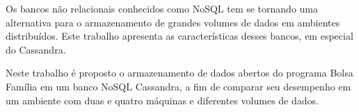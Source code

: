 Os bancos não relacionais conhecidos como NoSQL tem se tornando uma alternativa para o armazenamento de grandes volumes de dados em ambientes distribuídos. Este trabalho apresenta as características desses bancos, em especial do Cassandra.

Neste trabalho é proposto o armazenamento de dados abertos do programa Bolsa Família em um banco NoSQL Cassandra, a fim de comparar seu desempenho em um ambiente com duas e quatro máquinas e diferentes volumes de dados. 